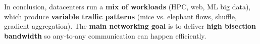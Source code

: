 \highspace
In conclusion, datacenters run a \textbf{mix of workloads} (HPC, web, ML big data), which produce \textbf{variable traffic patterns} (mice vs. elephant flows, shuffle, gradient aggregation). The \textbf{main networking goal} is to deliver \textbf{high bisection bandwidth} so any-to-any communication can happen efficiently.
